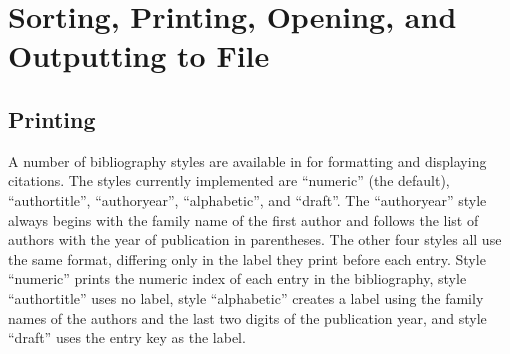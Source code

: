 \documentclass[article]{jss}\usepackage[]{graphicx}\usepackage[]{color}
\newcommand{\ourpkg}{\pkg{RefManageR}}
\begin{document}
\section{Sorting, Printing, Opening, and Outputting to File}\label{sec_print}
\subsection{Printing}
A number of \Biblatex{} bibliography styles are available in \ourpkg{} for formatting and displaying citations.  The styles currently implemented are ``numeric'' (the default), ``authortitle'', ``authoryear'', ``alphabetic'', and ``draft''.  The ``authoryear'' style always begins with the family name of the first author and follows the list of authors with the year of publication in parentheses.  The other four styles all use the same format, differing only in the label they print before each entry.  Style ``numeric'' prints the numeric index of each entry in the bibliography, style ``authortitle'' uses no label, style ``alphabetic'' creates a label using the family names of the authors and the last two digits of the publication year, and style ``draft'' uses the entry key as the label.
\end{document}
